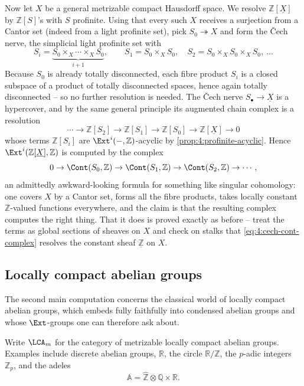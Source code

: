 Now let $X$ be a general metrizable compact Hausdorff space. We resolve
$\mathbb{Z}[\underline{X}]$ by $\mathbb{Z}[S]$'s with $S$ profinite. Using that
every such $X$ receives a surjection from a Cantor set (indeed from a light
profinite set), pick $S_0\twoheadrightarrow X$ and form the \v{C}ech nerve, the
simplicial light profinite set with
\begin{equation*}
S_i=\underbrace{S_0\times_X\cdots\times_X S_0}_{i+1},
\qquad
S_1=S_0\times_X S_0,\quad S_2=S_0\times_X S_0\times_X S_0,\ \dots
\end{equation*}
Because $S_0$ is already totally disconnected, each fibre product $S_i$ is a
closed subspace of a product of totally disconnected spaces, hence again totally
disconnected -- so no further resolution is needed. The \v{C}ech nerve
$S_\bullet\to\underline{X}$ is a hypercover, and by the same general principle
its augmented chain complex is a resolution
\begin{equation*}
\cdots\to\mathbb{Z}[S_2]\to\mathbb{Z}[S_1]\to\mathbb{Z}[S_0]\to
\mathbb{Z}[\underline{X}]\to0
\end{equation*}
whose terms $\mathbb{Z}[S_i]$ are $\Ext^i(-,\mathbb{Z})$-acyclic by
\cref{prop:4:profinite-acyclic}. Hence $\Ext^{i}(\mathbb{Z}[\underline{X}],
\mathbb{Z})$ is computed by the complex
\begin{equation}
\label{eq:4:cech-cont-complex}
0\to\Cont(S_0,\mathbb{Z})\to\Cont(S_1,\mathbb{Z})\to\Cont(S_2,\mathbb{Z})\to\cdots,
\end{equation}
an admittedly awkward-looking formula for something like singular cohomology: one
covers $X$ by a Cantor set, forms all the fibre products, takes locally constant
$\mathbb{Z}$-valued functions everywhere, and the claim is that the resulting
complex computes the right thing. That it does is proved exactly as before --
treat the terms as global sections of sheaves on $X$ and check on stalks that
\eqref{eq:4:cech-cont-complex} resolves the constant sheaf $\underline{\mathbb{Z}}$
on $X$.

\subsection{Locally compact abelian groups}

The second main computation concerns the classical world of locally compact
abelian groups, which embeds fully faithfully into condensed abelian groups and
whose $\Ext$-groups one can therefore ask about.

\begin{notation}
\label{not:4:lca}
Write $\LCA_m$ for the category of metrizable locally compact abelian groups.
Examples include discrete abelian groups, $\mathbb{R}$, the circle
$\mathbb{R}/\mathbb{Z}$, the $p$-adic integers $\mathbb{Z}_p$, and the adeles
\begin{equation*}
\mathbb{A}=\widehat{\mathbb{Z}}\otimes\mathbb{Q}\times\mathbb{R}.
\end{equation*}
\end{notation}

